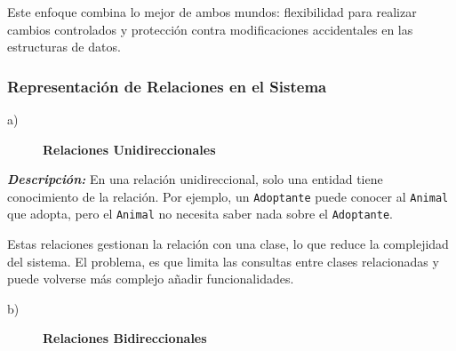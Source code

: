 Este enfoque combina lo mejor de ambos mundos: flexibilidad para realizar cambios controlados 
y protección contra modificaciones accidentales en las estructuras de datos.

\subsubsection{Representación de Relaciones en el Sistema}

\begin{description}
    \item[a)] \textbf{Relaciones Unidireccionales}
\end{description}

\textit{\textbf{Descripción:}}  
En una relación unidireccional, solo una entidad tiene conocimiento de la relación. 
Por ejemplo, un \texttt{Adoptante} puede conocer al \texttt{Animal} que adopta, 
pero el \texttt{Animal} no necesita saber nada sobre el \texttt{Adoptante}.\par
\vspace{0.15cm} 
Estas relaciones gestionan la relación con una clase, lo que reduce la complejidad del sistema.
El problema, es que limita las consultas entre clases relacionadas y puede volverse más complejo 
añadir funcionalidades.\par
\vspace{0.15cm}

\begin{description}
    \item[b)] \textbf{Relaciones Bidireccionales}
\end{description}

